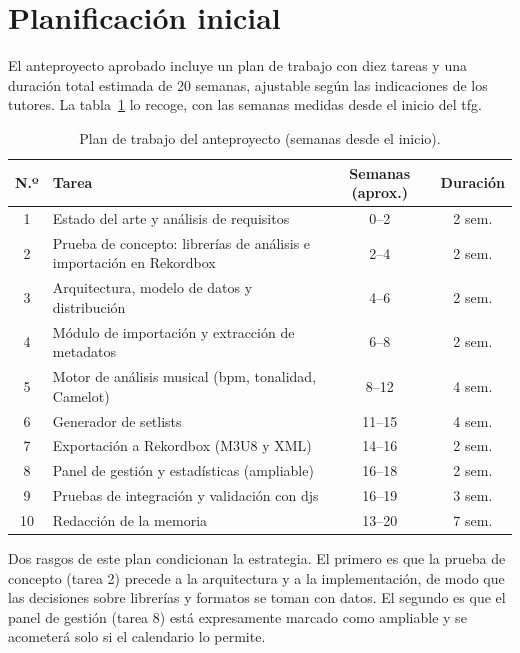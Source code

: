 \section{Planificación inicial}
\label{sec:met-planificacion}

El anteproyecto aprobado incluye un plan de trabajo con diez tareas y una duración total estimada de 20 semanas, ajustable según las indicaciones de los tutores. La tabla~\ref{tab:met-gantt} lo recoge, con las semanas medidas desde el inicio del \acs{tfg}.

\begin{table}[htbp]
  \centering
  \caption{Plan de trabajo del anteproyecto (semanas desde el inicio).}
  \label{tab:met-gantt}
  \small
  \begin{tabularx}{\textwidth}{|c|X|c|c|}
    \hline
    \textbf{N.º} & \textbf{Tarea} & \textbf{Semanas (aprox.)} & \textbf{Duración} \\
    \hline
    1  & Estado del arte y análisis de requisitos & 0--2 & 2 sem. \\
    \hline
    2  & Prueba de concepto: librerías de análisis e importación en Rekordbox & 2--4 & 2 sem. \\
    \hline
    3  & Arquitectura, modelo de datos y distribución & 4--6 & 2 sem. \\
    \hline
    4  & Módulo de importación y extracción de metadatos & 6--8 & 2 sem. \\
    \hline
    5  & Motor de análisis musical (\acs{bpm}, tonalidad, Camelot) & 8--12 & 4 sem. \\
    \hline
    6  & Generador de setlists & 11--15 & 4 sem. \\
    \hline
    7  & Exportación a Rekordbox (M3U8 y XML) & 14--16 & 2 sem. \\
    \hline
    8  & Panel de gestión y estadísticas (ampliable) & 16--18 & 2 sem. \\
    \hline
    9  & Pruebas de integración y validación con \acsp{dj} & 16--19 & 3 sem. \\
    \hline
    10 & Redacción de la memoria & 13--20 & 7 sem. \\
    \hline
  \end{tabularx}
\end{table}

Dos rasgos de este plan condicionan la estrategia. El primero es que la prueba de concepto (tarea 2) precede a la arquitectura y a la implementación, de modo que las decisiones sobre librerías y formatos se toman con datos. El segundo es que el panel de gestión (tarea 8) está expresamente marcado como ampliable y se acometerá solo si el calendario lo permite.

